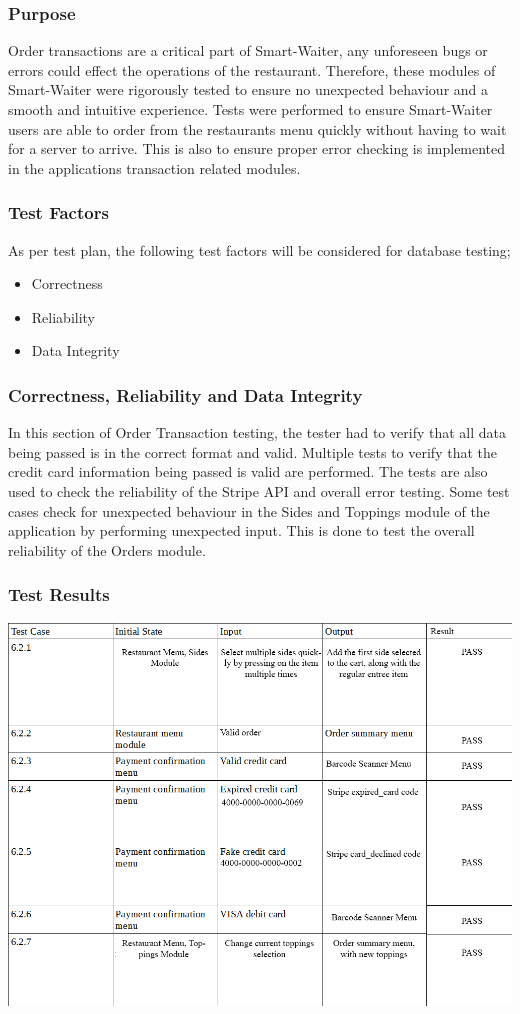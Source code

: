 \documentclass[12pt, titlepage]{article}
\begin{document}
\subsubsection{Purpose}
Order transactions are a critical part of Smart-Waiter, any unforeseen bugs or errors could effect the operations of the restaurant. Therefore, these modules of Smart-Waiter were rigorously tested to ensure no unexpected behaviour and a smooth and intuitive experience. Tests were performed to ensure Smart-Waiter users are able to order from the restaurants menu quickly without having to wait for a server to arrive. This is also to ensure proper error checking is implemented in the applications transaction related modules.

\subsubsection{Test Factors}
As per test plan, the following test factors will be considered for database testing;
\begin{itemize}
 \item Correctness
 \item Reliability
 \item Data Integrity
 \end{itemize}
\subsubsection{Correctness, Reliability and Data Integrity}
In this section of Order Transaction testing, the tester had to verify that all data being passed is in the correct format and valid. Multiple tests to verify that the credit card information being passed is valid are performed. The tests are also used to check the reliability of the Stripe API and overall error testing. Some test cases check for unexpected behaviour in the Sides and Toppings module of the application by performing unexpected input. This is done to test the overall reliability of the Orders module.    

\subsubsection{Test Results}
\includegraphics[width=1.2\textwidth]{orderTransactionTC.png}
\end{document}

